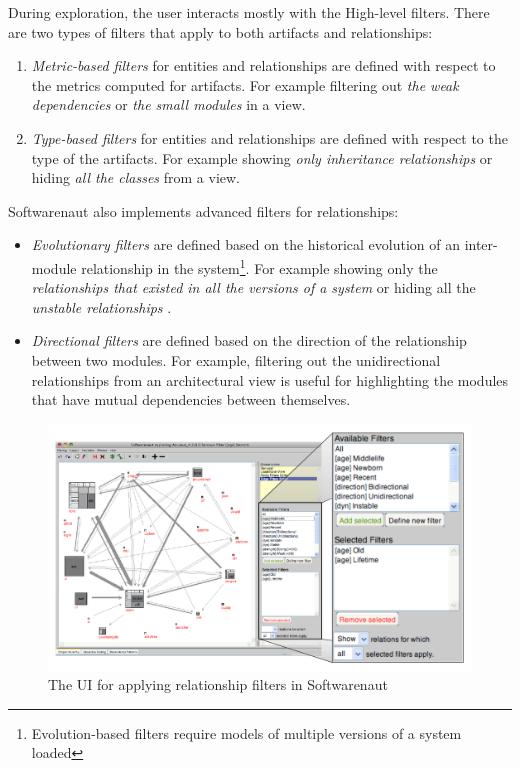 \documentclass[preprint,12pt]{elsarticle}
\begin{document}
During exploration, the user interacts mostly with the High-level filters. There are two types of filters that apply to both artifacts and relationships: 

\begin{enumerate}

\item {\em Metric-based filters} for entities and relationships are defined with respect to the metrics computed for artifacts. For example filtering out {\em the weak dependencies} or {\em the small modules} in a view.

\item {\em Type-based filters} for entities and relationships are defined with respect to the type of the artifacts. For example showing {\em only inheritance relationships} or hiding {\em all the classes} from a view.

\end{enumerate}

Softwarenaut also implements advanced filters for relationships:

\begin{itemize}

\item {\em Evolutionary filters} are defined based on the historical evolution of an inter-module relationship in the system\footnote{Evolution-based filters require models of multiple versions of a system loaded}. For example showing only the {\em relationships that existed in all the versions of a system} or hiding all the {\em unstable relationships} \cite{lungu-relevo}.

\item {\em Directional filters} are defined based on the direction of the relationship between two modules. For example, filtering out the unidirectional relationships from an architectural view is useful for highlighting the modules that have mutual dependencies between themselves. 

\end{itemize}

\begin{figure}[ht]
\begin{center}
\includegraphics[width=\linewidth]{SnautFilteringPanel}
\caption{The UI for applying relationship filters in Softwarenaut}
\end{center}
\end{figure}
\end{document}

